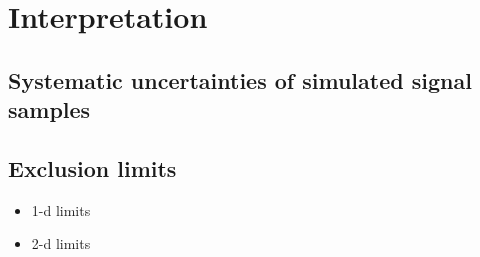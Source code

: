 \section{Interpretation}
\label{sec:Interpretation}
\subsection{Systematic uncertainties of simulated signal samples}
\subsection{Exclusion limits}
\begin{itemize}
\item 1-d limits
\item 2-d limits
\end{itemize}

